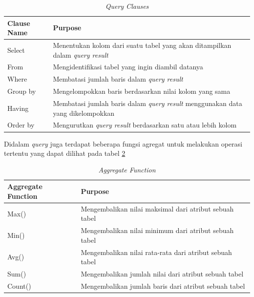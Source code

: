 \begin{table}[h!]
	\centering
	\begin{tabular}{|l|l|} 
		\hline
		\textbf{Clause Name} & \textbf{Purpose} \\
		\hline
		Select & Menentukan kolom dari suatu tabel yang akan ditampilkan dalam \textit{query result}\\
		\hline
		From & Mengidentifikasi tabel yang ingin diambil datanya\\
		\hline
		Where & Membatasi jumlah baris dalam \textit{query result}\\
		\hline
		Group by & Mengelompokkan baris berdasarkan nilai kolom yang sama\\
		\hline
		Having & Membatasi jumlah baris dalam \textit{query result} menggunakan data yang dikelompokkan\\
		\hline
		Order by & Mengurutkan \textit{query result} berdasarkan satu atau lebih kolom\\
		\hline
	\end{tabular}
	\caption{\textit{Query Clauses}}
	\label{table:query_clause}
\end{table}

Didalam \textit{query} juga terdapat beberapa fungsi agregat untuk melakukan operasi tertentu yang dapat dilihat pada tabel \ref{table:agg_func}
\begin{table}[h!]
	\centering
	\begin{tabular}{|l|l|} 
		\hline
		\textbf{Aggregate Function} & \textbf{Purpose} \\
		\hline
		Max() & Mengembalikan nilai maksimal dari atribut sebuah tabel\\
		\hline
		Min() & Mengembalikan nilai minimum dari atribut sebuah tabel\\
		\hline
		Avg() & Mengembalikan nilai rata-rata dari atribut sebuah tabel\\
		\hline
		Sum() & Mengembalikan jumlah nilai dari atribut sebuah tabel\\
		\hline
		Count() & Mengembalikan jumlah baris dari atribut sebuah tabel\\
		\hline
	\end{tabular}
	\caption{\textit{Aggregate Function}}
	\label{table:agg_func}
\end{table}

